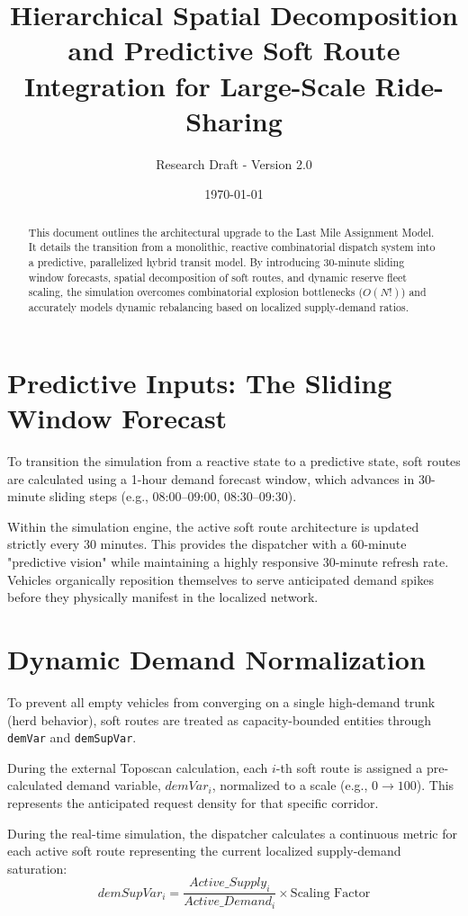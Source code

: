 \documentclass[12pt,a4paper]{article}
\title{\textbf{Hierarchical Spatial Decomposition and Predictive Soft Route Integration for Large-Scale Ride-Sharing}}
\author{Research Draft - Version 2.0}
\date{\today}
\begin{document}
\maketitle

\begin{abstract}
This document outlines the architectural upgrade to the Last Mile Assignment Model. It details the transition from a monolithic, reactive combinatorial dispatch system into a predictive, parallelized hybrid transit model. By introducing 30-minute sliding window forecasts, spatial decomposition of soft routes, and dynamic reserve fleet scaling, the simulation overcomes combinatorial explosion bottlenecks ($O(N!)$) and accurately models dynamic rebalancing based on localized supply-demand ratios.
\end{abstract}

\section{Predictive Inputs: The Sliding Window Forecast}
To transition the simulation from a reactive state to a predictive state, soft routes are calculated using a 1-hour demand forecast window, which advances in 30-minute sliding steps (e.g., 08:00--09:00, 08:30--09:30). 

Within the simulation engine, the active soft route architecture is updated strictly every 30 minutes. This provides the dispatcher with a 60-minute "predictive vision" while maintaining a highly responsive 30-minute refresh rate. Vehicles organically reposition themselves to serve anticipated demand spikes before they physically manifest in the localized network.

\section[Dynamic Demand Normalization (demVar and demSupVar)]{Dynamic Demand Normalization}
To prevent all empty vehicles from converging on a single high-demand trunk (herd behavior), soft routes are treated as capacity-bounded entities through \texttt{demVar} and \texttt{demSupVar}. 

During the external Toposcan calculation, each $i$-th soft route is assigned a pre-calculated demand variable, $demVar_i$, normalized to a scale (e.g., $0 \to 100$). This represents the anticipated request density for that specific corridor.

During the real-time simulation, the dispatcher calculates a continuous metric for each active soft route representing the current localized supply-demand saturation:
\begin{equation}
    demSupVar_i = \frac{Active\_Supply_i}{Active\_Demand_i} \times \text{Scaling Factor}
\end{equation}
\end{document}
